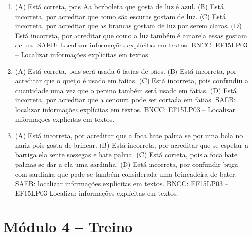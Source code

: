 \begin{enumerate}
\item
(A) Está correta, pois Aa borboleta que gosta de luz é azul.
(B) Está incorreta, por acreditar que como são escuras gostam de luz.
(C) Está incorreta, por acreditar que as brancas gostam de luz por serem claras.
(D) Está incorreta, por acreditar que como a luz também é amarela essas gostam de luz.
SAEB: Localizar informações explícitas em textos.
BNCC: EF15LP03 -- Localizar informações explícitas em textos.

\item
(A) Está correta, pois será usada 6 fatias de pães.
(B) Está incorreta, por acreditar que o queijo é usado em fatias.
(C) Está incorreta, pois confundiu a quantidade uma vez que o pepino também será usado em fatias.
(D) Está incorreta, por acreditar que a cenoura pode ser cortada em fatias.
SAEB: localizar informações explícitas em textos.
BNCC: EF15LP03 -- Localizar informações explícitas em textos.

\item
(A) Está incorreta, por acreditar que a foca bate palma se por uma bola
no nariz pois gosta de brincar.
(B) Está incorreta, por acreditar que se espetar a barriga ela sente
sossegas e bate palma.
(C) Está correta, pois a foca bate palmas se dar a ela uma sardinha.
(D) Está incorreta, por confundir briga com sardinha que pode se também
considerada uma brincadeira de bater.
SAEB: localizar informações explícitas em textos.
BNCC: EF15LP03 -- EF15LP03 Localizar informações explícitas em textos.
\end{enumerate}

\section*{Módulo 4 – Treino}

